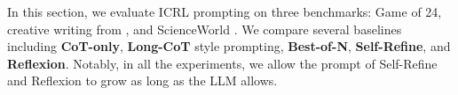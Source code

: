 \documentclass{article} %
\newcommand{\am}[1]{({\color{magenta}Amir: #1})}
\newcommand{\kf}[1]{({\color{teal} {gary: #1}})}
\newcommand{\0}{\mathbf{0}}
\begin{document}





In this section, we evaluate ICRL prompting on three benchmarks: Game of 24, creative writing from \citet{tot}, and ScienceWorld \citep{wang_scienceworld_2022}. 
We compare several baselines including \textbf{CoT-only}, \textbf{Long-CoT} style prompting, \textbf{Best-of-N}, \textbf{Self-Refine}, and \textbf{Reflexion}. 
Notably,
in all the experiments,
we allow the prompt of Self-Refine and Reflexion to grow as long as the LLM allows.

\end{document}
